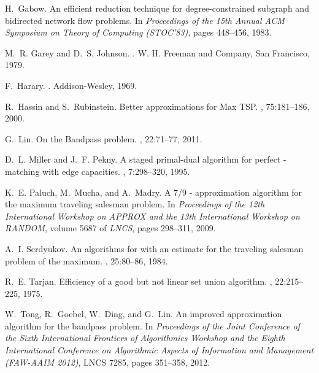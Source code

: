 \documentclass[11pt,twoside]{article}\usepackage{amssymb,latexsym,graphicx,hyperref}\usepackage{epstopdf}
\begin{document}
\begin{thebibliography}{10}
H.~Gabow.
\newblock An efficient reduction technique for degree-constrained subgraph and
  bidirected network flow problems.
\newblock In {\em Proceedings of the 15th Annual ACM Symposium on Theory of
  Computing (STOC'83)}, pages 448--456, 1983.

M.~R. Garey and D.~S. Johnson.
.
\newblock W. H. Freeman and Company, San Francisco, 1979.

F.~Harary.
.
\newblock Addison-Wesley, 1969.

R.~Hassin and S.~Rubinstein.
\newblock Better approximations for {Max} {TSP}.
, 75:181--186, 2000.

G.~Lin.
\newblock On the {Bandpass} problem.
, 22:71--77, 2011.

D.~L. Miller and J.~F. Pekny.
\newblock A staged primal-dual algorithm for perfect -matching with edge
  capacities.
, 7:298--320, 1995.

K.~E. Paluch, M.~Mucha, and A.~Madry.
\newblock A 7/9 - approximation algorithm for the maximum traveling salesman
  problem.
\newblock In {\em Proceedings of the 12th International Workshop on APPROX and
  the 13th International Workshop on RANDOM}, volume 5687 of {\em LNCS}, pages
  298--311, 2009.

A.~I. Serdyukov.
\newblock An algorithms for with an estimate for the traveling salesman problem
  of the maximum.
, 25:80--86, 1984.

R.~E. Tarjan.
\newblock Efficiency of a good but not linear set union algorithm.
, 22:215--225, 1975.

W.~Tong, R.~Goebel, W.~Ding, and G.~Lin.
\newblock An improved approximation algorithm for the bandpass problem.
\newblock In {\em Proceedings of the Joint Conference of the Sixth
  International Frontiers of Algorithmics Workshop and the Eighth International
  Conference on Algorithmic Aspects of Information and Management (FAW-AAIM
  2012)}, LNCS 7285, pages 351--358, 2012.

\end{thebibliography}
\end{document}
